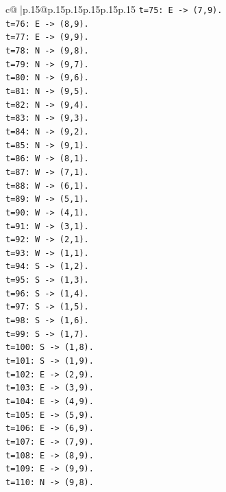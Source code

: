 \documentclass{article}
\begin{document}
{\begin{supertabular}{c@{$\;$}|p{.15\linewidth}@{}p{.15\linewidth}p{.15\linewidth}p{.15\linewidth}p{.15\linewidth}p{.15\linewidth}}
{{{\texttt{t=75: E {-}> (7,9).} \\
\texttt{t=76: E {-}> (8,9).} \\
\texttt{t=77: E {-}> (9,9).} \\
\texttt{t=78: N {-}> (9,8).} \\
\texttt{t=79: N {-}> (9,7).} \\
\texttt{t=80: N {-}> (9,6).} \\
\texttt{t=81: N {-}> (9,5).} \\
\texttt{t=82: N {-}> (9,4).} \\
\texttt{t=83: N {-}> (9,3).} \\
\texttt{t=84: N {-}> (9,2).} \\
\texttt{t=85: N {-}> (9,1).} \\
\texttt{t=86: W {-}> (8,1).} \\
\texttt{t=87: W {-}> (7,1).} \\
\texttt{t=88: W {-}> (6,1).} \\
\texttt{t=89: W {-}> (5,1).} \\
\texttt{t=90: W {-}> (4,1).} \\
\texttt{t=91: W {-}> (3,1).} \\
\texttt{t=92: W {-}> (2,1).} \\
\texttt{t=93: W {-}> (1,1).} \\
\texttt{t=94: S {-}> (1,2).} \\
\texttt{t=95: S {-}> (1,3).} \\
\texttt{t=96: S {-}> (1,4).} \\
\texttt{t=97: S {-}> (1,5).} \\
\texttt{t=98: S {-}> (1,6).} \\
\texttt{t=99: S {-}> (1,7).} \\
\texttt{t=100: S {-}> (1,8).} \\
\texttt{t=101: S {-}> (1,9).} \\
\texttt{t=102: E {-}> (2,9).} \\
\texttt{t=103: E {-}> (3,9).} \\
\texttt{t=104: E {-}> (4,9).} \\
\texttt{t=105: E {-}> (5,9).} \\
\texttt{t=106: E {-}> (6,9).} \\
\texttt{t=107: E {-}> (7,9).} \\
\texttt{t=108: E {-}> (8,9).} \\
\texttt{t=109: E {-}> (9,9).} \\
\texttt{t=110: N {-}> (9,8).} \\
}}}
\end{supertabular}}
\end{document}
